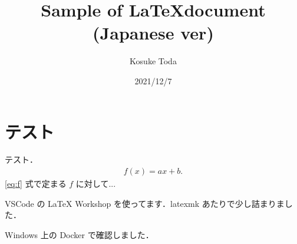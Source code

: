 \documentclass[dvipdfmx]{jsarticle}
\begin{document}
    \title{Sample of \LaTeX document (Japanese ver)}
    \author{Kosuke Toda}
    \date{2021/12/7}
    \maketitle

    \section{テスト}
    テスト．
    \begin{align}
        f(x) = ax + b. \label{eq:f}
    \end{align}
    \eqref{eq:f} 式で定まる $f$ に対して...

    VSCode の LaTeX Workshop を使ってます．latexmk あたりで少し詰まりました．

    Windows 上の Docker で確認しました．
\end{document}
